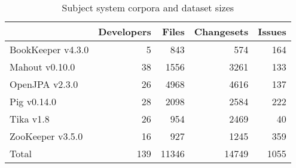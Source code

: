 \begin{table}
\centering
\caption{Subject system corpora and dataset sizes}
\label{table:subjects}
\begin{tabular}{lrrrr}
\toprule
{}                &  Developers &  Files &  Changesets &  Issues \\
\midrule
BookKeeper v4.3.0 &           5 &    843 &         574 &     164 \\
Mahout v0.10.0    &          38 &   1556 &        3261 &     133 \\
OpenJPA v2.3.0    &          26 &   4968 &        4616 &     137 \\
Pig v0.14.0       &          28 &   2098 &        2584 &     222 \\
Tika v1.8         &          26 &    954 &        2469 &      40 \\
ZooKeeper v3.5.0  &          16 &    927 &        1245 &     359 \\
\midrule
Total             &         139 &  11346 &       14749 &    1055 \\
\bottomrule
\end{tabular}
\end{table}
